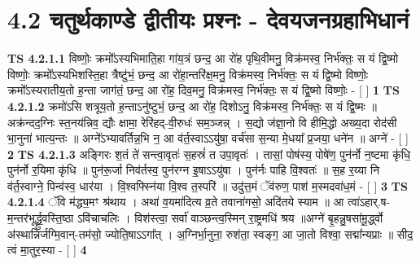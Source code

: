 \documentclass[17pt]{extarticle}
\begin{document}
     \section*{ 4.2      चतुर्थकाण्डे द्वीतीयः प्रश्नः - देवयजनग्रहाभिधानं }
                                        \textbf{ TS 4.2.1.1} \newline
                  विष्णोः॒ क्रमो᳚ऽस्यभिमाति॒हा गा॑य॒त्रं छन्द॒ आ रो॑ह पृथि॒वीमनु॒ विक्र॑मस्व॒ निर्भ॑क्तः॒ स यं द्वि॒ष्मो विष्णोः॒ क्रमो᳚ऽस्यभिशस्ति॒हा त्रैष्टु॑भं॒ छन्द॒ आ रो॑हा॒न्तरि॑क्ष॒मनु॒ विक्र॑मस्व॒ निर्भ॑क्तः॒ स यं द्वि॒ष्मो विष्णोः॒ क्रमो᳚ऽस्यरातीय॒तो ह॒न्ता जाग॑तं॒ छन्द॒ आ रो॑ह॒ दिव॒मनु॒ विक्र॑मस्व॒ निर्भ॑क्तः॒ स यं द्वि॒ष्मो विष्णोः॒ - [  ] \textbf{  1} \newline
                  \newline
                                \textbf{ TS 4.2.1.2} \newline
                  क्रमो॑ऽसि शत्रूय॒तो ह॒न्ताऽनु॑ष्टुभं॒ छन्द॒ आ रो॑ह॒ दिशोऽनु॒ विक्र॑मस्व॒ निर्भ॑क्तः॒ स यं द्वि॒ष्मः ॥ अक्र॑न्दद॒ग्निः स्त॒नय॑न्निव॒ द्यौः क्षामा॒ रेरि॑हद्-वी॒रुधः॑ सम॒ञ्जन्न् । स॒द्यो ज॑ज्ञा॒नो वि हीमि॒द्धो अख्य॒दा रोद॑सी भा॒नुना॑ भात्य॒न्तः ॥ अग्ने᳚ऽभ्यावर्तिन्न॒भि न॒ आ व॑र्त॒स्वाऽऽयु॑षा॒ वर्च॑सा स॒न्या मे॒धया᳚ प्र॒जया॒ धने॑न ॥ अग्ने॑ - [  ] \textbf{  2} \newline
                  \newline
                                \textbf{ TS 4.2.1.3} \newline
                  अङ्गिरः श॒तं ते॑ सन्त्वा॒वृतः॑ स॒हस्रं॑ त उपा॒वृतः॑ । तासां॒ पोष॑स्य॒ पोषे॑ण॒ पुन॑र्नो न॒ष्टमा कृ॑धि॒ पुन॑र्नो र॒यिमा कृ॑धि ॥ पुन॑रू॒र्जा निव॑र्तस्व॒ पुन॑रग्न इ॒षाऽऽयु॑षा । पुन॑र्नः पाहि वि॒श्वतः॑ ॥ स॒ह र॒य्या नि व॑र्त॒स्वाग्ने॒ पिन्व॑स्व॒ धार॑या । वि॒श्वफ्स्नि॑या वि॒श्व त॒स्परि॑ ॥ उदु॑त्त॒मं ॅव॑रुण॒ पाश॑ म॒स्मदवा॑ध॒मं - [  ] \textbf{  3} \newline
                  \newline
                                \textbf{ TS 4.2.1.4} \newline
                  ॅवि म॑द्ध्य॒मꣳ श्र॑थाय । अथा॑ व॒यमा॑दित्य व्र॒ते तवाना॑गसो॒ अदि॑तये स्याम ॥ आ त्वा॑ऽहार्.ष-म॒न्तर॑भूर्द्ध्रु॒वस्ति॒ष्ठा ऽवि॑चाचलिः । विश॑स्त्वा॒ सर्वा॑ वाञ्छन्त्व॒स्मिन् रा॒ष्ट्रमधि॑ श्रय ॥अग्ने॑ बृ॒हन्नु॒षसा॑मू॒र्द्ध्वो अ॑स्थान्निर्जग्मि॒वान्-तम॑सो॒ ज्योति॒षाऽऽगा᳚त् । अ॒ग्निर्भा॒नुना॒ रुश॑ता॒ स्वङ्ग॒ आ जा॒तो विश्वा॒ सद्मा᳚न्यप्राः ॥ सीद॒ त्वं मा॒तुर॒स्या - [  ] \textbf{  4} \newline
\end{document}
